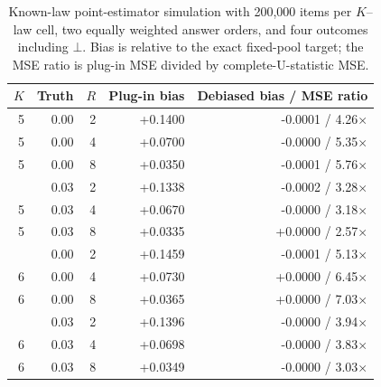 \begin{table}[t]
\centering
\small
\begin{tabular}{rrrrr}
\toprule
$K$ & Truth & $R$ & Plug-in bias & Debiased bias / MSE ratio \\
\midrule
5 & 0.00 & 2 & +0.1400 & -0.0001 / 4.26$\times$ \\
5 & 0.00 & 4 & +0.0700 & -0.0000 / 5.35$\times$ \\
5 & 0.00 & 8 & +0.0350 & -0.0001 / 5.76$\times$ \\
\addlinespace
5 & 0.03 & 2 & +0.1338 & -0.0002 / 3.28$\times$ \\
5 & 0.03 & 4 & +0.0670 & -0.0000 / 3.18$\times$ \\
5 & 0.03 & 8 & +0.0335 & +0.0000 / 2.57$\times$ \\
\addlinespace
6 & 0.00 & 2 & +0.1459 & -0.0001 / 5.13$\times$ \\
6 & 0.00 & 4 & +0.0730 & +0.0000 / 6.45$\times$ \\
6 & 0.00 & 8 & +0.0365 & +0.0000 / 7.03$\times$ \\
\addlinespace
6 & 0.03 & 2 & +0.1396 & -0.0000 / 3.94$\times$ \\
6 & 0.03 & 4 & +0.0698 & -0.0000 / 3.83$\times$ \\
6 & 0.03 & 8 & +0.0349 & -0.0000 / 3.03$\times$ \\
\bottomrule
\end{tabular}
\caption{Known-law point-estimator simulation with 200,000 items per
$K$--law cell, two equally weighted answer orders, and four outcomes including
$\bot$. Bias is relative to the exact fixed-pool target; the MSE ratio is
plug-in MSE divided by complete-U-statistic MSE.\maintextreproductionnote}
\end{table}
